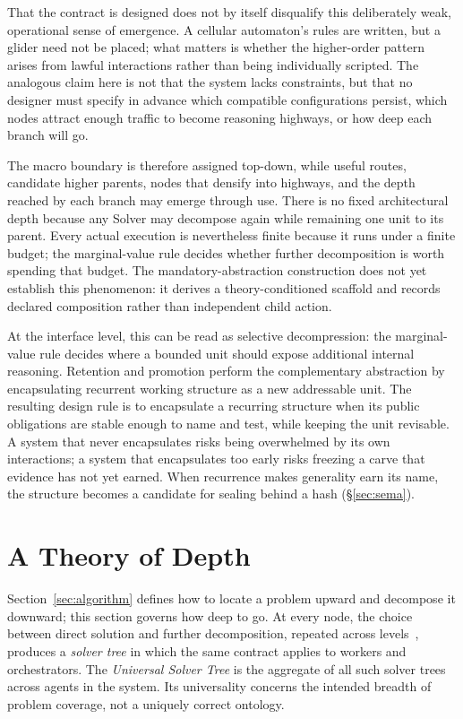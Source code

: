 \documentclass[11pt]{article}
\begin{document}
That the contract is designed does not by itself disqualify this deliberately weak, operational sense of emergence. A cellular automaton's rules are written, but a glider need not be placed; what matters is whether the higher-order pattern arises from lawful interactions rather than being individually scripted. The analogous claim here is not that the system lacks constraints, but that no designer must specify in advance which compatible configurations persist, which nodes attract enough traffic to become reasoning highways, or how deep each branch will go.

The macro boundary is therefore assigned top-down, while useful routes, candidate higher parents, nodes that densify into highways, and the depth reached by each branch may emerge through use. There is no fixed architectural depth because any Solver may decompose again while remaining one unit to its parent. Every actual execution is nevertheless finite because it runs under a finite budget; the marginal-value rule decides whether further decomposition is worth spending that budget. The mandatory-abstraction construction does not yet establish this phenomenon: it derives a theory-conditioned scaffold and records declared composition rather than independent child action.

At the interface level, this can be read as selective decompression: the marginal-value rule decides where a bounded unit should expose additional internal reasoning. Retention and promotion perform the complementary abstraction by encapsulating recurrent working structure as a new addressable unit. The resulting design rule is to encapsulate a recurring structure when its public obligations are stable enough to name and test, while keeping the unit revisable. A system that never encapsulates risks being overwhelmed by its own interactions; a system that encapsulates too early risks freezing a carve that evidence has not yet earned. When recurrence makes generality earn its name, the structure becomes a candidate for sealing behind a hash (\S\ref{sec:sema}).

\section{A Theory of Depth}
\label{sec:ri}

Section~\ref{sec:algorithm} defines how to locate a problem upward and decompose it downward; this section governs how deep to go. At every node, the choice between direct solution and further decomposition, repeated across levels~\cite{parnas1972,babbage1832}, produces a \emph{solver tree} in which the same contract applies to workers and orchestrators. The \emph{Universal Solver Tree} is the aggregate of all such solver trees across agents in the system. Its universality concerns the intended breadth of problem coverage, not a uniquely correct ontology.
\end{document}
